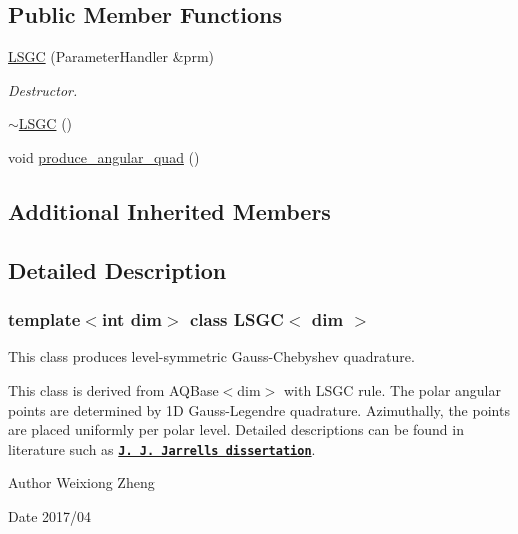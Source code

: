 \subsection*{Public Member Functions}
\begin{DoxyCompactItemize}
\item 
\hyperlink{class_l_s_g_c_a9b89f615563bd3583a4a6a36d7b3eb7d}{L\+S\+GC} (Parameter\+Handler \&prm)
\begin{DoxyCompactList}\small\item\em Destructor. \end{DoxyCompactList}\item 
\hyperlink{class_l_s_g_c_abcba8afdb075485278288db321776b7e}{$\sim$\+L\+S\+GC} ()
\item 
void \hyperlink{class_l_s_g_c_a1d135fb9ca12a9b65b8cc397479fc4d7}{produce\+\_\+angular\+\_\+quad} ()
\end{DoxyCompactItemize}
\subsection*{Additional Inherited Members}


\subsection{Detailed Description}
\subsubsection*{template$<$int dim$>$\newline
class L\+S\+G\+C$<$ dim $>$}

This class produces level-\/symmetric Gauss-\/\+Chebyshev quadrature. 

This class is derived from A\+Q\+Base$<$dim$>$ with L\+S\+GC rule. The polar angular points are determined by 1D Gauss-\/\+Legendre quadrature. Azimuthally, the points are placed uniformly per polar level. Detailed descriptions can be found in literature such as \href{http://oaktrust.library.tamu.edu/bitstream/handle/1969.1/ETD-T
AMU-2010-12-8586/JARRELL-DISSERTATION.pdf?sequence=2}{\tt {\bfseries  J. J. Jarrell\textquotesingle{}s dissertation}}.

\begin{DoxyAuthor}{Author}
Weixiong Zheng 
\end{DoxyAuthor}
\begin{DoxyDate}{Date}
2017/04 
\end{DoxyDate}


